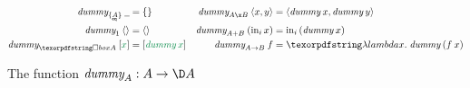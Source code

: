 \begin{figure}
  \begin{align*}
    \dummy_{\tseteq A} \<\pwild &= \eset{}
    &
    \dummy_{A \x B} \<\etuple{x,y} &= \etuple{\dummy\<x, \dummy\<y}
    \\
    \dummy_\tunit \<\etuple{} &= \etuple{}
    &
    \dummy_{A + B} \<(\inj i x) &= \inj i (\dummy\<x)
    \\
    \dummy_{\iso A} \<\ebox{x} &= \ebox{\dummy\<x}
    &
    \dummy_{A \to B} \<f &= \fnof{x} \dummy\<(f\<x)
  \end{align*}
  \caption{The function $\dummy_A : A \to \D A$}
  \label{fig:dummy}
\end{figure}
